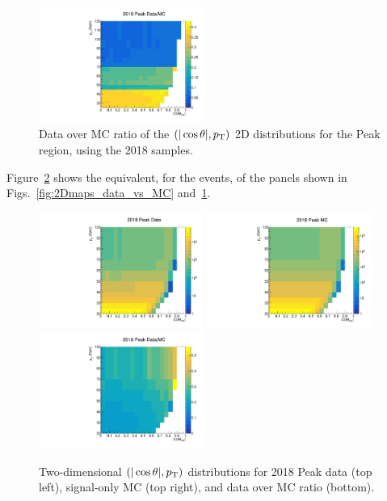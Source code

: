 \begin{figure}[h]
\centering
\includegraphics[width=0.48\textwidth]{Figures/chapter3/ratio_Peak.pdf}
\caption{Data over MC ratio of the \jpsi $(|\cos\theta|,p_\text{T})$ 2D distributions
for the Peak region, using the 2018 samples.}
\label{fig:2DmapsRatios}
\end{figure}

\vfill\newpage

Figure~\ref{fig:2Dmaps_psip} shows the equivalent, for the \psip events,
of the panels shown in Figs.~\ref{fig:2Dmaps_data_vs_MC} 
and~\ref{fig:2DmapsRatios}.

\begin{figure}[t]
\centering
\includegraphics[width=0.48\textwidth]{Figures/chapter3/data_2d_plot_psip.pdf}
\includegraphics[width=0.48\textwidth]{Figures/chapter3/mc_2d_plot_psip.pdf}
\includegraphics[width=0.48\textwidth]{Figures/chapter3/ratio_Peak_psip.pdf}
\caption{Two-dimensional \psip $(|\cos\theta|,p_\text{T})$ distributions for 2018 
Peak data (top left), signal-only MC (top right), and data over MC ratio (bottom).}
\label{fig:2Dmaps_psip}
\end{figure}

